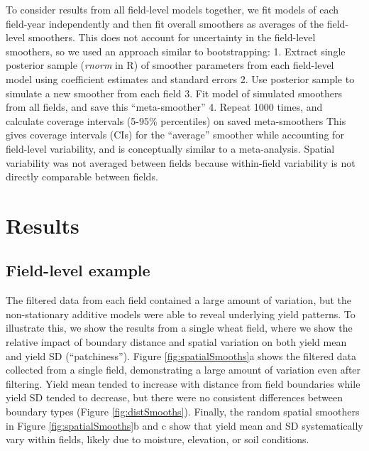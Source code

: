 \documentclass[]{elsarticle} %
\begin{document}
To consider results from all field-level models together, we fit models of each field-year independently and then fit overall smoothers as averages of the field-level smoothers.
This does not account for uncertainty in the field-level smoothers, so we used an approach similar to bootstrapping:
1. Extract single posterior sample (\emph{rnorm} in R) of smoother parameters from each field-level model using coefficient estimates and standard errors
2. Use posterior sample to simulate a new smoother from each field
3. Fit model of simulated smoothers from all fields, and save this ``meta-smoother''
4. Repeat 1000 times, and calculate coverage intervals (5-95\% percentiles) on saved meta-smoothers
This gives coverage intervals (CIs) for the ``average'' smoother while accounting for field-level variability, and is conceptually similar to a meta-analysis.
Spatial variability was not averaged between fields because within-field variability is not directly comparable between fields.

\hypertarget{results}{%
\section{Results}\label{results}}

\hypertarget{field-level-example}{%
\subsection{Field-level example}\label{field-level-example}}

The filtered data from each field contained a large amount of variation, but the non-stationary additive models were able to reveal underlying yield patterns.
To illustrate this, we show the results from a single wheat field, where we show the relative impact of boundary distance and spatial variation on both yield mean and yield SD (``patchiness'').
Figure \ref{fig:spatialSmooths}a shows the filtered data collected from a single field, demonstrating a large amount of variation even after filtering.
Yield mean tended to increase with distance from field boundaries while yield SD tended to decrease, but there were no consistent differences between boundary types (Figure \ref{fig:distSmooths}).
Finally, the random spatial smoothers in Figure \ref{fig:spatialSmooths}b and c show that yield mean and SD systematically vary within fields, likely due to moisture, elevation, or soil conditions.
\end{document}
